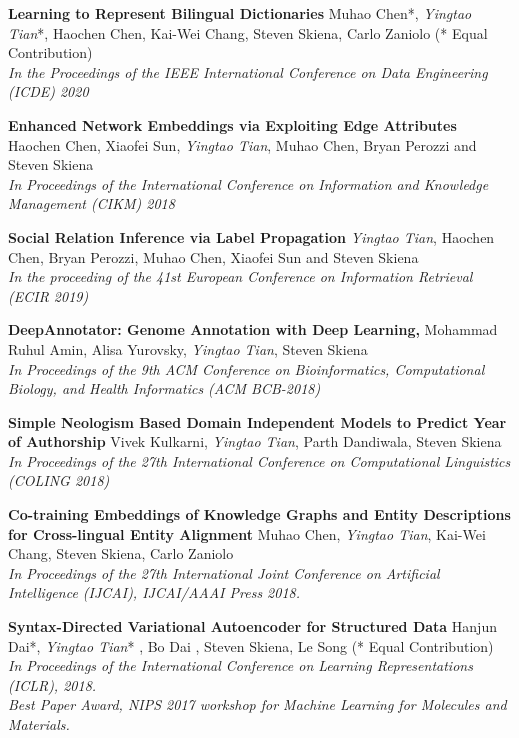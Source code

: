 \documentclass[line,margin]{cv}
\begin{document}
\begin{resume}
  {\bf  Learning to Represent Bilingual Dictionaries}
  Muhao Chen*, \emph{Yingtao Tian}*, Haochen Chen, Kai-Wei Chang, Steven Skiena, Carlo Zaniolo  (* Equal Contribution)\\
  \emph{In the Proceedings of the IEEE International Conference on Data Engineering (ICDE) 2020}
  
  {\bf  Enhanced Network Embeddings via Exploiting Edge Attributes}
   Haochen Chen, Xiaofei Sun, \emph{Yingtao Tian}, Muhao Chen, Bryan Perozzi and Steven Skiena\\
  \emph{In Proceedings of the International Conference on Information and Knowledge Management (CIKM) 2018}

  {\bf Social Relation Inference via Label Propagation}
  \emph{Yingtao Tian}, Haochen Chen, Bryan Perozzi, Muhao Chen, Xiaofei Sun and Steven Skiena\\
  \emph{In the proceeding of the 41st European Conference on Information Retrieval (ECIR 2019)}
  
  {\bf DeepAnnotator: Genome Annotation with Deep Learning,}
  Mohammad Ruhul Amin, Alisa Yurovsky, \emph{Yingtao Tian}, Steven Skiena \\
  \emph{In Proceedings of the 9th ACM Conference on Bioinformatics, Computational Biology, and Health Informatics (ACM BCB-2018)}
  
  {\bf Simple Neologism Based Domain Independent Models to Predict Year of Authorship}
   Vivek Kulkarni, \emph{Yingtao Tian}, Parth Dandiwala, Steven Skiena \\
  \emph{In Proceedings of the 27th International Conference on Computational Linguistics (COLING 2018)}

  {\bf Co-training Embeddings of Knowledge Graphs and Entity Descriptions for Cross-lingual Entity Alignment}
  Muhao Chen, \emph{Yingtao Tian}, Kai-Wei Chang, Steven Skiena, Carlo Zaniolo\\
  \emph{In Proceedings of the 27th International Joint Conference on Artificial Intelligence (IJCAI), IJCAI/AAAI Press 2018.}
  
  {\bf Syntax-Directed Variational Autoencoder for Structured Data}
  Hanjun Dai*, \emph{Yingtao Tian}* , Bo Dai , Steven Skiena, Le Song (* Equal Contribution)\\
  \emph{In Proceedings of the International Conference on Learning Representations (ICLR), 2018. \\
  Best Paper Award, NIPS 2017 workshop for Machine Learning for Molecules and Materials.}
  

\end{resume}
\end{document}
